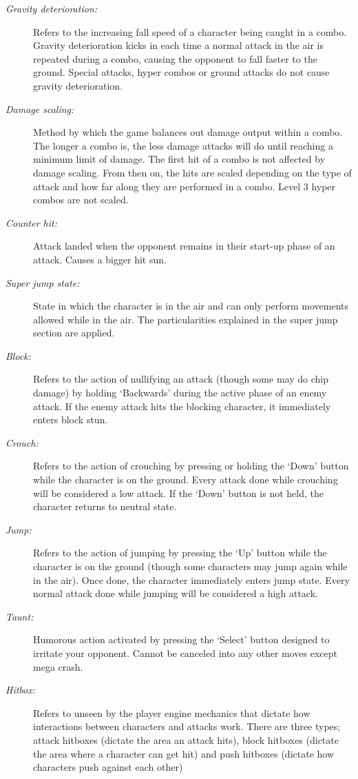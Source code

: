 \documentclass{article}
\begin{document}
\begin{flushleft}
\begin{description}
\item[\textit{Gravity deterioration:}] Refers to the increasing fall speed of a character being caught in a combo. Gravity deterioration kicks in each time a normal attack in the air is repeated during a combo, causing the opponent to fall faster to the ground. Special attacks, hyper combos or ground attacks do not cause gravity deterioration.
\item[\textit{Damage scaling:}] Method by which the game balances out damage output within a combo. The longer a combo is, the less damage attacks will do until reaching a minimum limit of damage. The first hit of a combo is not affected by damage scaling. From then on, the hits are scaled depending on the type of attack and how far along they are performed in a combo. Level 3 hyper combos are not scaled.
\item[\textit{Counter hit:}] Attack landed when the opponent remains in their start-up phase of an attack. Causes a bigger hit sun.
\item[\textit{Super jump state:}] State in which the character is in the air and can only perform movements allowed while in the air. The particularities explained in the super jump section are applied.
\item[\textit{Block:}] Refers to the action of nullifying an attack (though some may do chip damage) by holding `Backwards' during the active phase of an enemy attack. If the enemy attack hits the blocking character, it immediately enters block stun.
\item[\textit{Crouch:}] Refers to the action of crouching by pressing or holding the `Down' button while the character is on the ground. Every attack done while crouching will be considered a low attack. If the `Down' button is not held, the character returns to neutral state.
\item[\textit{Jump:}] Refers to the action of jumping by pressing the `Up' button while the character is on the ground (though some characters may jump again while in the air). Once done, the character immediately enters jump state. Every normal attack done while jumping will be considered a high attack.
\item[\textit{Taunt:}] Humorous action activated by pressing the `Select' button designed to irritate your opponent. Cannot be canceled into any other moves except mega crash.
\item[\textit{Hitbox:}] Refers to unseen by the player engine mechanics that dictate how interactions between characters and attacks work. There are three types; attack hitboxes (dictate the area an attack hits), block hitboxes (dictate the area where a character can get hit) and push hitboxes (dictate how characters push against each other)

 










\end{description}

\end{flushleft}
\end{document}
